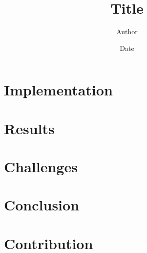 \documentclass[12pt]{article}
\title{Title}
\author{Author}
\date{Date}
\begin{document}
\section{Implementation}
\section{Results}
\section{Challenges}
\section{Conclusion}
\section{Contribution}
\end{document}
